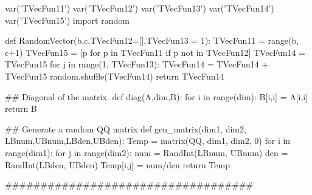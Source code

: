 \begin{sagesilent}
var('TVecFun11')
var('TVecFun12')
var('TVecFun13')
var('TVecFun14')
var('TVecFun15')
import random

def RandomVector(b,c,TVecFun12=[],TVecFun13 = 1):
   TVecFun11 = range(b, c+1)
   TVecFun15 = [p for p in TVecFun11 if p not in TVecFun12]
   TVecFun14 = TVecFun15
   for j in range(1, TVecFun13):
      TVecFun14 = TVecFun14 + TVecFun15
   random.shuffle(TVecFun14)
   return TVecFun14

## Diagonal of the matrix.
def diag(A,dim,B):
   for i in range(dim):
      B[i,i] = A[i,i]
   return B
   
   
## Generate a random QQ matrix
def gen_matrix(dim1, dim2, LBnum,UBnum,LBden,UBden):
   Temp = matrix(QQ, dim1, dim2, 0)
   for i in range(dim1):
      for j in range(dim2):
         num = RandInt(LBnum, UBnum)
         den = RandInt(LBden, UBden)
         Temp[i,j] = num/den
   return Temp
   
   
###################################

\end{sagesilent}